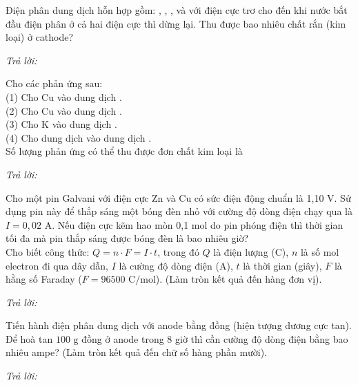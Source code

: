 \documentclass[11pt,a4paper]{article}
\def\loigiai#1{}
\begin{document}
\begin{ex}
Điện phân dung dịch hỗn hợp gồm: , , ,  và  với điện cực trơ cho đến khi nước bắt đầu điện phân ở cả hai điện cực thì dừng lại. Thu được bao nhiêu chất rắn (kim loại) ở cathode?
\par\noindent\textit{Trả lời:} \dotfill
\loigiai{}
\end{ex}

\begin{ex}
Cho các phản ứng sau:\\
(1) Cho Cu vào dung dịch .\\
(2) Cho Cu vào dung dịch .\\
(3) Cho K vào dung dịch .\\
(4) Cho dung dịch  vào dung dịch .\\
Số lượng phản ứng có thể thu được đơn chất kim loại là
\par\noindent\textit{Trả lời:} \dotfill
\loigiai{}
\end{ex}

\begin{ex}
Cho một pin Galvani với điện cực Zn và Cu có sức điện động chuẩn là 1,10 V. Sử dụng pin này để thắp sáng một bóng đèn nhỏ với cường độ dòng điện chạy qua là $I = 0{,}02\text{ A}$. Nếu điện cực kẽm hao mòn 0,1 mol do pin phóng điện thì thời gian tối đa mà pin thắp sáng được bóng đèn là bao nhiêu giờ?\\
Cho biết công thức: $Q = n \cdot F = I \cdot t$, trong đó $Q$ là điện lượng (C), $n$ là số mol electron đi qua dây dẫn, $I$ là cường độ dòng điện (A), $t$ là thời gian (giây), $F$ là hằng số Faraday ($F = 96500\text{ C/mol}$). (Làm tròn kết quả đến hàng đơn vị).
\par\noindent\textit{Trả lời:} \dotfill
\loigiai{}
\end{ex}

\begin{ex}
Tiến hành điện phân dung dịch  với anode bằng đồng (hiện tượng dương cực tan). Để hoà tan $100\text{ g}$ đồng ở anode trong 8 giờ thì cần cường độ dòng điện bằng bao nhiêu ampe? (Làm tròn kết quả đến chữ số hàng phần mười).
\par\noindent\textit{Trả lời:} \dotfill
\loigiai{}
\end{ex}


\end{document}
